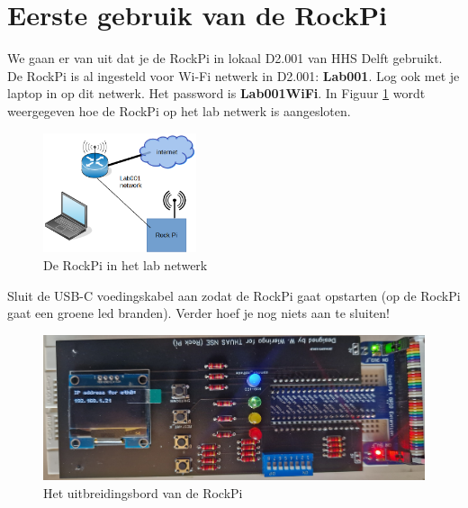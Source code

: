\section{Eerste gebruik van de RockPi}
We gaan er van uit dat je de RockPi in lokaal D2.001 van HHS Delft gebruikt. \newline
De RockPi is al ingesteld voor Wi-Fi netwerk in D2.001: \textbf{Lab001}. \newline
Log ook met je laptop in op dit netwerk. Het password is \textbf{Lab001WiFi}. \newline
In Figuur \ref{fig:netw} wordt weergegeven hoe de RockPi op het lab netwerk is aangesloten.
\begin{figure}[h!]
	\centering
	\begin{center} 	
		\includegraphics[width=0.4\textwidth]{figuren/laBnetwork}
		\caption{De RockPi in het lab netwerk}
		\label{fig:netw}   
	\end{center}
\end{figure}
\break
Sluit de USB-C voedingskabel aan zodat de RockPi gaat opstarten (op de RockPi gaat een groene led branden). Verder hoef je nog niets aan te sluiten!
\begin{figure}[h!]
	\centering
	\begin{center} 	
		\includegraphics[width=1\textwidth]{figuren/rockIPnr}
		\caption{Het uitbreidingsbord van de RockPi}
		\label{fig:rockIPnr}   
	\end{center}
\end{figure}

